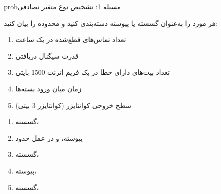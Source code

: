 \begin{PSbox}[unbreakable]{prob}{مسیله 1: تشخیص نوع متغیر تصادفی}

هر مورد را به‌عنوان گسسته یا پیوسته دسته‌بندی کنید و محدوده را بیان کنید:

\begin{enumerate}
\def\labelenumi{(\PSalph{enumi})}
\tightlist
\item
  تعداد تماس‌های قطع‌شده در یک ساعت
\item
  قدرت سیگنال دریافتی 
\item
  تعداد بیت‌های دارای خطا در یک فریم اترنت 1500 بایتی
\item
  زمان میان ورود بسته‌ها
\item
  سطح خروجی کوانتایزر (کوانتایزر 3 بیتی)
\end{enumerate}

\PSsolution{} 

\begin{enumerate}
\def\labelenumi{(\PSalph{enumi})}
\tightlist
\item
  گسسته، 
\item
  پیوسته،  و در عمل حدود 
\item
  گسسته، 
\item
  پیوسته، \lr{$T \in [0,\, \infty)$}
\item
  گسسته، 
\end{enumerate}

\end{PSbox}

